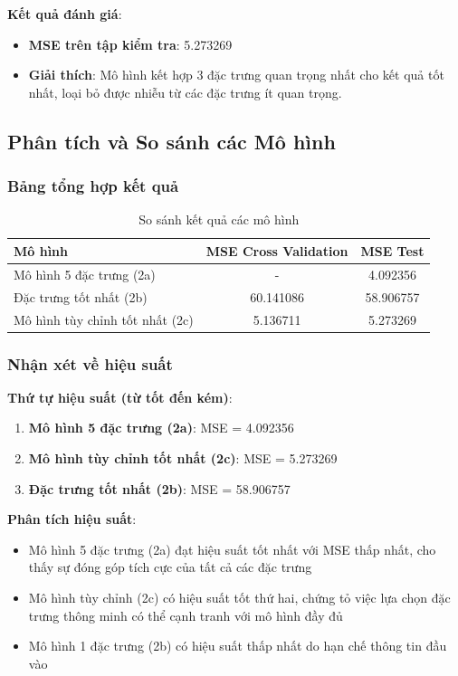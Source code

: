 \textbf{Kết quả đánh giá}:
\begin{itemize}
	\item \textbf{MSE trên tập kiểm tra}: 5.273269
	\item \textbf{Giải thích}: Mô hình kết hợp 3 đặc trưng quan trọng nhất cho kết quả tốt nhất, loại bỏ được nhiễu từ các đặc trưng ít quan trọng.
\end{itemize}

\subsection{Phân tích và So sánh các Mô hình}

\subsubsection{Bảng tổng hợp kết quả}

\begin{table}[H]
	\centering
	\begin{tabular}{|l|c|c|}
		\hline
		\textbf{Mô hình}                & \textbf{MSE Cross Validation} & \textbf{MSE Test} \\
		\hline
		Mô hình 5 đặc trưng (2a)        & -                             & 4.092356          \\
		\hline
		Đặc trưng tốt nhất (2b)         & 60.141086                     & 58.906757         \\
		\hline
		Mô hình tùy chỉnh tốt nhất (2c) & 5.136711                      & 5.273269          \\
		\hline
	\end{tabular}
	\caption{So sánh kết quả các mô hình}
	\label{tab:model_comparison}
\end{table}

\subsubsection{Nhận xét về hiệu suất}

\textbf{Thứ tự hiệu suất (từ tốt đến kém)}:
\begin{enumerate}
	\item \textbf{Mô hình 5 đặc trưng (2a)}: MSE = 4.092356
	\item \textbf{Mô hình tùy chỉnh tốt nhất (2c)}: MSE = 5.273269
	\item \textbf{Đặc trưng tốt nhất (2b)}: MSE = 58.906757
\end{enumerate}

\textbf{Phân tích hiệu suất}:
\begin{itemize}
	\item Mô hình 5 đặc trưng (2a) đạt hiệu suất tốt nhất với MSE thấp nhất, cho thấy sự đóng góp tích cực của tất cả các đặc trưng
	\item Mô hình tùy chỉnh (2c) có hiệu suất tốt thứ hai, chứng tỏ việc lựa chọn đặc trưng thông minh có thể cạnh tranh với mô hình đầy đủ
	\item Mô hình 1 đặc trưng (2b) có hiệu suất thấp nhất do hạn chế thông tin đầu vào
\end{itemize}

